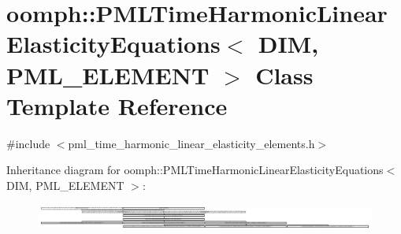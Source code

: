 \hypertarget{classoomph_1_1PMLTimeHarmonicLinearElasticityEquations}{}\section{oomph\+:\+:P\+M\+L\+Time\+Harmonic\+Linear\+Elasticity\+Equations$<$ D\+IM, P\+M\+L\+\_\+\+E\+L\+E\+M\+E\+NT $>$ Class Template Reference}
\label{classoomph_1_1PMLTimeHarmonicLinearElasticityEquations}


{\ttfamily \#include $<$pml\+\_\+time\+\_\+harmonic\+\_\+linear\+\_\+elasticity\+\_\+elements.\+h$>$}

Inheritance diagram for oomph\+:\+:P\+M\+L\+Time\+Harmonic\+Linear\+Elasticity\+Equations$<$ D\+IM, P\+M\+L\+\_\+\+E\+L\+E\+M\+E\+NT $>$\+:\begin{figure}[H]
\begin{center}
\leavevmode
\includegraphics[height=0.862423cm]{classoomph_1_1PMLTimeHarmonicLinearElasticityEquations}
\end{center}
\end{figure}
